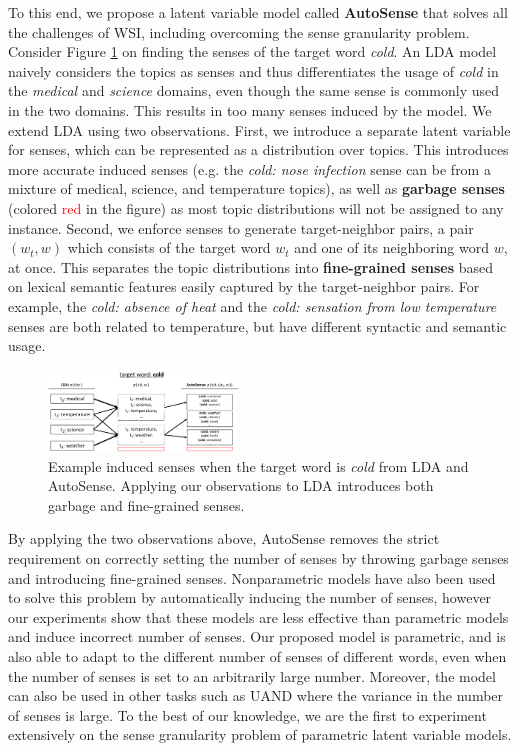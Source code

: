 \documentclass[letterpaper]{article} %
\begin{document}
To this end, we propose a latent variable model called \textbf{AutoSense} that solves all the challenges of WSI, including overcoming the sense granularity problem. Consider Figure \ref{fig:intuition} on finding the senses of the target word \textit{cold}. An LDA model naively considers the topics as senses and thus differentiates the usage of \textit{cold} in the \textit{medical} and \textit{science} domains, even though the same sense is commonly used in the two domains. This results in too many senses induced by the model. We extend LDA using two observations. First, we introduce a separate latent variable for senses, which can be represented as a distribution over topics. This introduces more accurate induced senses (e.g. the \textit{cold: nose infection} sense can be from a mixture of medical, science, and temperature topics), as well as \textbf{garbage senses} (colored \textcolor{red}{red} in the figure) as most topic distributions will not be assigned to any instance. Second, we enforce senses to generate target-neighbor pairs, a pair $(w_t, w)$ which consists of the target word $w_t$ and one of its neighboring word $w$, at once. This separates the topic distributions into \textbf{fine-grained senses} based on lexical semantic features easily captured by the target-neighbor pairs. For example, the \textit{cold: absence of heat} and the \textit{cold: sensation from low temperature} senses are both related to temperature, but have different syntactic and semantic usage.

\begin{figure}
	\centering
	\includegraphics[width=0.45\textwidth]{intro}
	\caption{Example induced senses when the target word is \textit{cold} from LDA and AutoSense. Applying our observations to LDA introduces both garbage and fine-grained senses.}
	\label{fig:intuition}
\end{figure}

By applying the two observations above, AutoSense removes the strict requirement on correctly setting the number of senses by throwing garbage senses and introducing fine-grained senses. Nonparametric models \cite{teh2004sharing,lau2013unimelb} have also been used to solve this problem by automatically inducing the number of senses, however our experiments show that these models are less effective than parametric models and induce incorrect number of senses. Our proposed model is parametric, and is also able to adapt to the different number of senses of different words, even when the number of senses is set to an arbitrarily large number. Moreover, the model can also be used in other tasks such as UAND where the variance in the number of senses is large. To the best of our knowledge, we are the first to experiment extensively on the sense granularity problem of parametric latent variable models.
\end{document}
